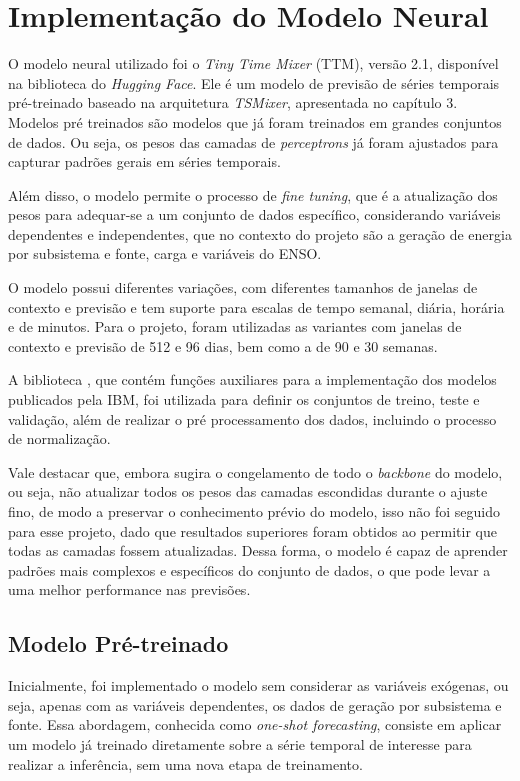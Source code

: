 \section{Implementação do Modelo Neural} %
O modelo neural utilizado foi o \textit{Tiny Time Mixer} (TTM), versão 2.1, disponível na biblioteca  do 
\textit{Hugging Face}. Ele é um modelo de previsão de séries temporais pré-treinado baseado na arquitetura \textit{TSMixer}, 
apresentada no capítulo 3. Modelos pré treinados são modelos que já foram treinados em grandes conjuntos de dados. Ou seja, 
os pesos das camadas de \textit{perceptrons} já foram ajustados para capturar padrões gerais em séries temporais.

Além disso, o modelo permite o processo de \textit{fine tuning}, que é a atualização dos pesos para adequar-se
a um conjunto de dados específico, considerando variáveis dependentes e independentes, que no contexto do projeto são a geração de energia
por subsistema e fonte, carga e variáveis do ENSO.

O modelo possui diferentes variações, com diferentes tamanhos de janelas de contexto e previsão e tem suporte para escalas 
de tempo semanal, diária, horária e de minutos. Para o projeto, foram utilizadas as variantes com janelas de contexto e 
previsão de 512 e 96 dias, bem como a de 90 e 30 semanas.

A biblioteca , que contém funções auxiliares para a implementação dos modelos publicados pela IBM, foi
utilizada para definir os conjuntos de treino, teste e validação, além de realizar o pré processamento dos dados, incluindo o
processo de normalização.

Vale destacar que, embora  sugira o congelamento de todo o \textit{backbone} do modelo, ou seja, 
não atualizar todos os pesos das camadas escondidas durante o ajuste fino, de modo a preservar o conhecimento prévio do modelo,
isso não foi seguido para esse projeto, dado que resultados superiores foram obtidos ao permitir que todas as camadas 
fossem atualizadas. Dessa forma, o modelo é capaz de aprender padrões mais complexos e específicos do conjunto de dados, 
o que pode levar a uma melhor performance nas previsões.

\subsection{Modelo Pré-treinado} %
Inicialmente, foi implementado o modelo sem considerar as variáveis exógenas, ou seja, apenas com as variáveis dependentes, os 
dados de geração por subsistema e fonte. Essa abordagem, conhecida como \textit{one-shot forecasting}, consiste em aplicar 
um modelo já treinado diretamente sobre a série temporal de interesse para realizar a inferência, sem uma nova etapa de treinamento.

